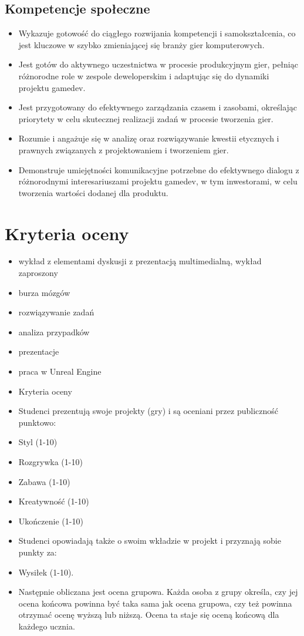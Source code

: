 \documentclass[12pt, a4paper]{article}
\begin{document}
\subsection*{Kompetencje społeczne}
\begin{itemize}
  \item Wykazuje gotowość do ciągłego rozwijania kompetencji i samokształcenia, co jest kluczowe w szybko zmieniającej się branży gier komputerowych.
  \item Jest gotów do aktywnego uczestnictwa w procesie produkcyjnym gier, pełniąc różnorodne role w zespole deweloperskim i adaptując się do dynamiki projektu gamedev.
  \item Jest przygotowany do efektywnego zarządzania czasem i zasobami, określając priorytety w celu skutecznej realizacji zadań w procesie tworzenia gier.
  \item Rozumie i angażuje się w analizę oraz rozwiązywanie kwestii etycznych i prawnych związanych z projektowaniem i tworzeniem gier.
  \item Demonstruje umiejętności komunikacyjne potrzebne do efektywnego dialogu z różnorodnymi interesariuszami projektu gamedev, w tym inwestorami, w celu tworzenia wartości dodanej dla produktu.
\end{itemize}

\section{Kryteria oceny}

\begin{itemize}
  \item wykład z elementami dyskusji z prezentacją multimedialną, wykład zaproszony
  \item burza mózgów
  \item rozwiązywanie zadań
  \item analiza przypadków
  \item prezentacje
  \item praca w Unreal Engine
  \item Kryteria oceny
  \item Studenci prezentują swoje projekty (gry) i są oceniani przez publiczność punktowo:
  \item Styl (1-10)
  \item Rozgrywka (1-10)
  \item Zabawa (1-10)
  \item Kreatywność (1-10)
  \item Ukończenie (1-10)
  \item Studenci opowiadają także o swoim wkładzie w projekt i przyznają sobie punkty za:
  \item Wysiłek (1-10).
  \item Następnie obliczana jest ocena grupowa. Każda osoba z grupy określa, czy jej ocena końcowa powinna być taka sama jak ocena grupowa, czy też powinna otrzymać ocenę wyższą lub niższą. Ocena ta staje się oceną końcową dla każdego ucznia.
\end{itemize}
\end{document}

